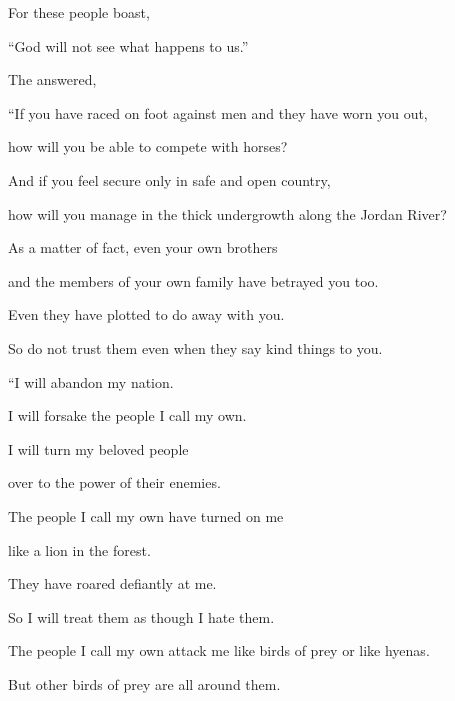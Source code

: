 {\par }{\Q For these people boast,
\par }{\Q “God will not
see
what happens to us.”
\par }{\PP {}The
{} answered,

\par }{\Q “If
you have raced
on foot against men and they
have worn
you out,
\par }{\Q how
will you be able to compete
with
horses?
\par }{\Q And if you
feel secure
only in safe
and open country,
\par }{\Q how
will you
manage
in the thick undergrowth
along the Jordan River?
\par }{\Q {}As a matter of fact, even
your own brothers
\par }{\Q and the members
of your own family
have betrayed
you too.
\par }{\Q Even they
have plotted
to do away with
you.

\par }{\Q So do not
trust
them even when they say
kind things
to you.
\par }{\Q {}“I will abandon
my nation.
\par }{\Q I will forsake
the
people
I call my own.

\par }{\Q I will turn
my beloved
people

\par }{\Q over to the power
of their enemies.
\par }{\Q {}The people I call my own
have turned on
me
\par }{\Q like a lion
in the forest.
\par }{\Q They have roared
defiantly at me.
\par }{\Q So I will
treat them
as though I
hate them.
\par }{\Q {}The people
I call my own attack me like birds of prey
or like hyenas.
\par }{\Q But other birds of prey
are all around
them.

}
